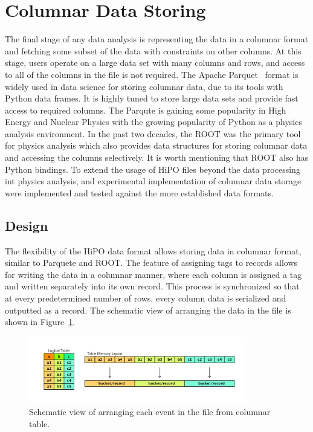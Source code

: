 \section{Columnar Data Storing}

The final stage of any data analysis is representing the data in a columnar format and fetching some subset of the data with constraints 
on other columns. At this stage, users operate on a large data set with many columns and rows, and access to all of the 
columns in the file is not required. The Apache Parquet~\cite{PARKQUET:2020jk} format is widely used in data science for storing columnar data, due to its tools
with Python data frames. It is highly tuned to store large data sets and provide fast access to required columns. The Parqute is gaining
some popularity in High Energy and Nuclear Physics with the growing popularity of Python as a physics analysis environment. In the
past two decades, the ROOT was the primary tool for physics analysis which also provides data structures for storing columnar data 
and accessing the columns selectively. It is worth mentioning that ROOT also has Python bindings. To extend the usage of HiPO files beyond
the data processing int physics analysis, and experimental implementation of columnar data storage were implemented and tested against the more established data formats.

\subsection{Design}

The flexibility of the HiPO data format allows storing data in columnar format, similar to Parquete and ROOT. 
The feature of assigning tags to records allows for writing the data in a columnar manner, where each column is assigned a tag and written separately into its own record.
This process is synchronized so that at every predetermined number of rows, every column data is serialized and outputted as a record. The schematic view of arranging 
the data in the file is shown in Figure~\ref{fig:tuple_schema}.

\begin{figure}[h!]
  \begin{center}
    \includegraphics[width=0.85\textwidth]{images/tuple_schema.pdf}
 \end{center}
  \caption{Schematic view of arranging each event in the file from columnar table.}
 \label{fig:tuple_schema}
\end{figure}

